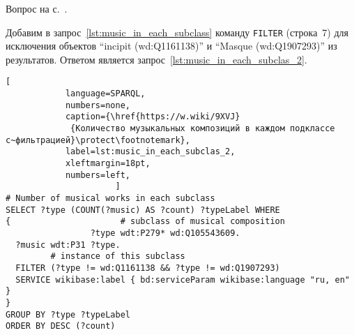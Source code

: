 \hfil{}\hfil%
\begin{task}
    \label{answer:music_in_each_subclas_filter}
    \AnswerBackref Вопрос на с.~\pageref{question:music_comp}.
    
    Добавим в запрос~\ref{lst:music_in_each_subclass} команду 
    \lstinline|FILTER| (строка~7) для исключения 
    объектов ``incipit (wd:Q1161138)'' и ``Masque (wd:Q1907293)'' из результатов. 
    Ответом является запрос~\ref{lst:music_in_each_subclas_2}. 
    \begin{lstlisting}[ 
            language=SPARQL, 
            numbers=none, 
            caption={\href{https://w.wiki/9XVJ}
		     {Количество музыкальных композиций в каждом подклассе с~фильтрацией}\protect\footnotemark}, 
            label=lst:music_in_each_subclas_2, 
            xleftmargin=18pt,
            numbers=left,
                      ]
# Number of musical works in each subclass
SELECT ?type (COUNT(?music) AS ?count) ?typeLabel WHERE 
{                      # subclass of musical composition
                 ?type wdt:P279* wd:Q105543609.      
  ?music wdt:P31 ?type.
         # instance of this subclass
  FILTER (?type != wd:Q1161138 && ?type != wd:Q1907293)
  SERVICE wikibase:label { bd:serviceParam wikibase:language "ru, en" }
}
GROUP BY ?type ?typeLabel
ORDER BY DESC (?count)
\end{lstlisting}
\end{task}




